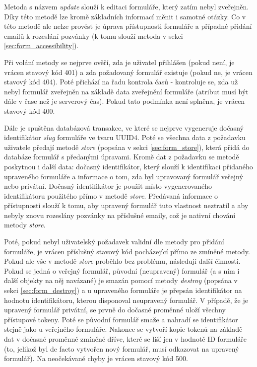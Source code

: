 			\label{sec:form_update}
			Metoda s názvem \textit{update} slouží k editaci formuláře, který zatím nebyl zveřejněn. Díky této metodě lze kromě základních informací měnit i samotné otázky. Co v této metodě ale nelze provést je úprava přístupnosti formuláře a případné přidání emailů k rozeslání pozvánky (k tomu slouží metoda v sekci \ref{sec:form_accessibility}).
			
			Při volání metody se nejprve ověří, zda je uživatel přihlášen (pokud není, je vrácen stavový kód 401) a zda požadovaný formulář existuje (pokud ne, je vrácen stavový kód 404). Poté přichází na řadu kontrola časů - kontroluje se, zda už nebyl formulář zveřejněn na základě data zveřejnění formuláře (atribut musí být dále v čase než je serverový čas). Pokud tato podmínka není splněna, je vrácen stavový kód 400.
			
			Dále je spuštěna databázová transakce, ve které se nejprve vygeneruje dočasný identifikátor \textit{slug} formuláře ve tvaru UUID4. Poté se všechna data z požadavku uživatele předají metodě \textit{store} (popsána v sekci \ref{sec:form_store}), která přidá do databáze formulář s předanými úpravami. Kromě dat z požadavku se metodě poskytnou i další data: dočasný identifikátor, který slouží k identifikaci přidaného upraveného formuláře a informace o tom, zda byl upravovaný formulář veřejný nebo privátní. Dočasný identifikátor je použit místo vygenerovaného identifikátoru použitého přímo v metodě \textit{store}. Předávaná informace o přístupnosti slouží k tomu, aby upravený formulář tuto vlastnost neztratil a aby nebyly znovu rozeslány pozvánky na příslušné emaily, což je nativní chování metody \textit{store}. 
			
			Poté, pokud nebyl uživatelský požadavek validní dle metody pro přidání formuláře, je vrácen příslušný stavový kód pocházející přímo ze zmíněné metody. Pokud ale vše v metodě \textit{store} proběhlo bez problému, následují další činnosti. Pokud se jedná o veřejný formulář, původní (neupravený) formulář (a s ním i další objekty na něj navázané) je smazán pomocí metody \textit{destroy} (popsána v sekci \ref{sec:form_destroy}) a u upraveného formuláře je přepsán identifikátor na hodnotu identifikátoru, kterou disponoval neupravený formulář. V případě, že je upravený formulář privátní, se prvně do dočasné proměnné uloží všechny přístupové tokeny. Poté se původní formulář smaže a nahradí se identifikátor stejně jako u veřejného formuláře. Nakonec se vytvoří kopie tokenů na základě dat v dočasné proměnné zmíněné dříve, které se liší jen v hodnotě ID formuláře (to, jelikož byl de facto vytvořen nový formulář, musí odkazovat na upravený formulář). Na neočekávané chyby je vrácen stavový kód 500.
			
